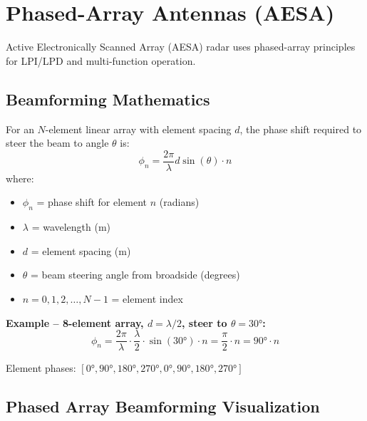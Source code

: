 \section{Phased-Array Antennas (AESA)}

Active Electronically Scanned Array (AESA) radar uses phased-array principles for LPI/LPD and multi-function operation.

\subsection{Beamforming Mathematics}

For an $N$-element linear array with element spacing $d$, the phase shift required to steer the beam to angle $\theta$ is:
\begin{equation}
\phi_n = \frac{2\pi}{\lambda} d \sin(\theta) \cdot n
\end{equation}
where:
\begin{itemize}
\item $\phi_n$ = phase shift for element $n$ (radians)
\item $\lambda$ = wavelength (m)
\item $d$ = element spacing (m)
\item $\theta$ = beam steering angle from broadside (degrees)
\item $n = 0, 1, 2, \ldots, N-1$ = element index
\end{itemize}

\textbf{Example -- 8-element array, $d = \lambda/2$, steer to $\theta = 30°$:}
\begin{equation}
\phi_n = \frac{2\pi}{\lambda} \cdot \frac{\lambda}{2} \cdot \sin(30°) \cdot n = \frac{\pi}{2} \cdot n = 90° \cdot n
\end{equation}

Element phases: $[0°, 90°, 180°, 270°, 0°, 90°, 180°, 270°]$

\subsection{Phased Array Beamforming Visualization}

